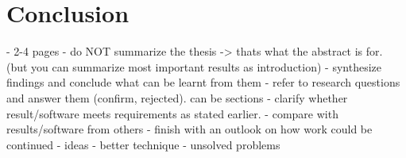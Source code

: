 \chapter{Conclusion}

- 2-4 pages
- do NOT summarize the thesis -> thats what the abstract is for. (but you can summarize most important results as introduction)
- synthesize findings and conclude what can be learnt from them
- refer to research questions and answer them (confirm, rejected). can be sections
- clarify whether result/software meets requirements as stated earlier.
- compare with results/software from others
- finish with an outlook on how work could be continued
  - ideas
  - better technique
  - unsolved problems
